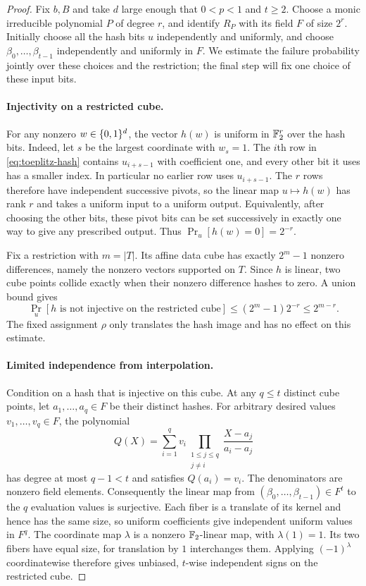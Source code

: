 \begin{proof}
Fix $b,B$ and take $d$ large enough that $0<p<1$ and $t\ge2$.
Choose a monic irreducible polynomial $P$ of degree $r$, and identify
$R_P$ with its field $F$ of size $2^r$.  Initially
choose all the hash bits $u$ independently and uniformly, and choose
$\beta_0,\ldots,\beta_{t-1}$ independently and uniformly in $F$.  We estimate
the failure probability jointly over these choices and the restriction;
the final step will fix one choice of these input bits.

\paragraph{Injectivity on a restricted cube.}
For any nonzero $w\in\{0,1\}^d$, the vector $h(w)$ is uniform in
$\mathbb F_2^r$ over the hash bits.  Indeed, let $s$ be the largest coordinate
with $w_s=1$.  The $i$th row in \eqref{eq:toeplitz-hash} contains
$u_{i+s-1}$ with coefficient one, and every other bit it uses has a
smaller index.  In particular no earlier row uses $u_{i+s-1}$.  The $r$
rows therefore have independent successive pivots, so the linear map
$u\mapsto h(w)$ has rank $r$ and takes a uniform input to a uniform
output.  Equivalently, after choosing the other bits, these pivot bits
can be set successively in exactly one way to give any prescribed output.
Thus $\Pr_u[h(w)=0]=2^{-r}$.

Fix a restriction with $m=|T|$.  Its affine data cube has exactly
$2^m-1$ nonzero differences, namely the nonzero vectors supported on $T$.
Since $h$ is linear, two cube points collide exactly when their nonzero
difference hashes to zero.  A union bound gives
\begin{equation}\label{eq:hash-collision}
 \Pr_u[h\text{ is not injective on the restricted cube}]
 \le(2^m-1)2^{-r}\le2^{m-r}.
\end{equation}
The fixed assignment $\rho$ only translates the hash image and has no
effect on this estimate.

\paragraph{Limited independence from interpolation.}
Condition on a hash that is injective on this cube.  At any $q\le t$
distinct cube points, let $a_1,\ldots,a_q\in F$ be their distinct hashes.
For arbitrary desired values $v_1,\ldots,v_q\in F$, the polynomial
\[
 Q(X)=\sum_{i=1}^q v_i
       \prod_{\substack{1\le j\le q\\j\ne i}}
          \frac{X-a_j}{a_i-a_j}
\]
has degree at most $q-1<t$ and satisfies $Q(a_i)=v_i$.
The denominators are nonzero field elements.  Consequently the linear map
from $(\beta_0,\ldots,\beta_{t-1})\in F^t$ to the $q$ evaluation values is
surjective.  Each fiber is a translate of its kernel and hence has the
same size, so uniform coefficients give independent uniform values in
$F^q$.  The coordinate map $\lambda$ is a nonzero $\mathbb F_2$-linear map,
with $\lambda(1)=1$.  Its two fibers have equal size, for translation by
$1$ interchanges them.  Applying $(-1)^\lambda$ coordinatewise therefore
gives unbiased, $t$-wise independent signs on the restricted cube.


\end{proof}
